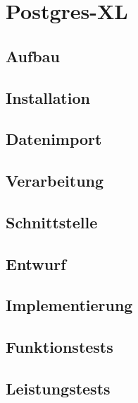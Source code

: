 \chapter{Postgres-XL}
\label{chapter:postgresxl}

\section{Aufbau}

\section{Installation}

\section{Datenimport}

\section{Verarbeitung}

\section{Schnittstelle}

\section{Entwurf}

\section{Implementierung}

\section{Funktionstests}

\section{Leistungstests}